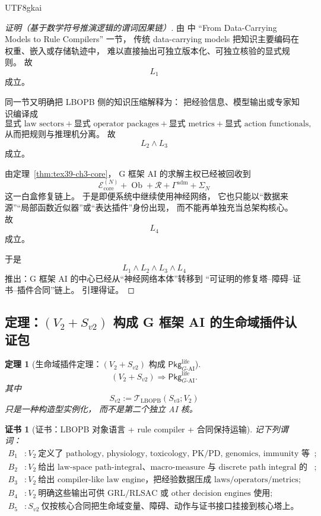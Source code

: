 \documentclass[12pt]{article}
\newtheorem{theorem}{定理}[section]
\newtheorem{Certificate}{证书}[section]
\newcommand{\Ob}{\operatorname{Ob}}
\begin{document}
\begin{CJK*}{UTF8}{gkai}
\begin{proof}[证明（基于数学符号推演逻辑的谓词因果链）]
由
\cite{GaoZhengAppVol2}
中 “From Data-Carrying Models to Rule Compilers”
一节，
传统 data-carrying models 把知识主要编码在权重、嵌入或存储轨迹中，
难以直接抽出可独立版本化、可独立核验的显式规则。
故
\[
  L_1
\]
成立。

同一节又明确把 LBOPB 侧的知识压缩解释为：
把经验信息、模型输出或专家知识编译成
\[
  \text{显式 law sectors}
  +\text{显式 operator packages}
  +\text{显式 metrics}
  +\text{显式 action functionals},
\]
从而把规则与推理机分离。
故
\[
  L_2\wedge L_3
\]
成立。

由定理~\ref{thm:tex39-ch3-core}，
G 框架 AI 的求解主权已经被回收到
\[
  \mathcal E_{\mathrm{core}}^{(N)}+\Ob+\mathcal R+\Gamma^{\mathrm{adm}}+\Sigma_N
\]
这一白盒修复链上。
于是即便系统中继续使用神经网络，
它也只能以“数据来源”“局部函数近似器”或“表达插件”身份出现，
而不能再单独充当总架构核心。
故
\[
  L_4
\]
成立。

于是
\[
  L_1\wedge L_2\wedge L_3\wedge L_4
\]
推出：G 框架 AI 的中心已经从“神经网络本体”转移到
“可证明的修复塔--障碍--证书--插件合同”链上。
引理得证。
\end{proof}

\subsection{定理：\texorpdfstring{$(V_2+S_{v2})$}{(V2+S-v2)} 构成 G 框架 AI 的生命域插件认证包}
\label{subsec:tex39-ch3-theorem-life}

\begin{theorem}[生命域插件定理：\texorpdfstring{$(V_2+S_{v2})$}{(V2+S-v2)} 构成 \texorpdfstring{$\mathsf{Pkg}_{G\text{-AI}}
  ^{\mathrm{life}}$}{Pkg-life}]
\label{thm:tex39-ch3-life}
\[
  (V_2+S_{v2})
  \Longrightarrow
  \mathsf{Pkg}_{G\text{-AI}}^{\mathrm{life}}.
\]
其中
\[
  S_{v2}
  :=
  \mathcal T_{\mathrm{LBOPB}}(S_{v3};V_2)
\]
只是一种构造型实例化，
而不是第二个独立 AI 核。
\end{theorem}

\begin{Certificate}[证书：LBOPB 对象语言 + rule compiler + 合同保持运输]
\label{cert:tex39-ch3-life}
记下列谓词：
\[
\begin{aligned}
  B_1 &: V_2\ \text{定义了 pathology, physiology, toxicology, PK/PD, genomics, immunity 等域对象};\\
  B_2 &: V_2\ \text{给出 law-space path-integral、macro-measure 与 discrete path integral 的对应};\\
  B_3 &: V_2\ \text{给出 compiler-like law engine，把经验数据压成 laws/operators/metrics};\\
  B_4 &: V_2\ \text{明确这些输出可供 GRL/RLSAC 或 other decision engines 使用};\\
  B_5 &: S_{v2}\ \text{仅按核心合同把生命域变量、障碍、动作与证书接口挂接到核心塔上。}
\end{aligned}
\]
\end{Certificate}


\end{CJK*}
\end{document}
